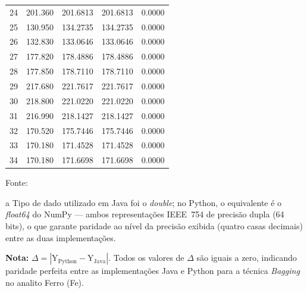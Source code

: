 \begin{table}[H]
\begin{threeparttable}
{\begin{tabular}{
    S[table-format=2.0]
    S[table-format=3.3]
    S[table-format=3.4]
    S[table-format=3.4]
    S[table-format=1.4]
}
 24 & 201.360 & 201.6813 & 201.6813 & 0.0000 \\
 25 & 130.950 & 134.2735 & 134.2735 & 0.0000 \\
 26 & 132.830 & 133.0646 & 133.0646 & 0.0000 \\
 27 & 177.820 & 178.4886 & 178.4886 & 0.0000 \\
 28 & 177.850 & 178.7110 & 178.7110 & 0.0000 \\
 29 & 217.680 & 221.7617 & 221.7617 & 0.0000 \\
 30 & 218.800 & 221.0220 & 221.0220 & 0.0000 \\
 31 & 216.990 & 218.1427 & 218.1427 & 0.0000 \\
 32 & 170.520 & 175.7446 & 175.7446 & 0.0000 \\
 33 & 170.180 & 171.4528 & 171.4528 & 0.0000 \\
 34 & 170.180 & 171.6698 & 171.6698 & 0.0000 \\
\bottomrule
\end{tabular}%
}
\begin{center}
\begin{minipage}{0.85\linewidth}
\begin{tablenotes}
\footnotesize
\item Fonte:~\oautor
\item[a] Tipo de dado utilizado em Java foi o \textit{double}; no Python,
o equivalente é o \textit{float64} do NumPy — ambos representações IEEE~754
de precisão dupla (64 bits), o que garante paridade ao nível da precisão exibida (quatro casas decimais) entre as
duas implementações.
\item \textbf{Nota:} $\Delta = |\text{Y}_{\text{Python}} - \text{Y}_{\text{Java}}|$.
Todos os valores de $\Delta$ são iguais a zero, indicando paridade
perfeita entre as implementações Java e Python para a técnica \textit{Bagging}
no analito Ferro (Fe).
\end{tablenotes}
\end{minipage}
\end{center}
\end{threeparttable}
\end{table}

